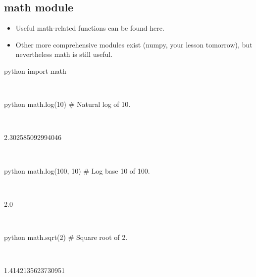 \documentclass[aspectratio=1610,slidestop]{beamer}
\begin{document}
\subsection{math module}
\begin{pframe}
 \begin{itemize}
  \item Useful math-related functions can be found here.
  \item Other more comprehensive modules exist (numpy, your lesson tomorrow),
  but nevertheless math is still useful.
 \end{itemize}
 \begin{ipython}
  \begin{pythonin}{python}
import math
  \end{pythonin}
  \\
  \begin{pythonin}{python}
math.log(10)    # Natural log of 10.
  \end{pythonin}
  \\
  \begin{pythonout}
2.302585092994046
  \end{pythonout}
  \\

  \begin{pythonin}{python}
math.log(100, 10)    # Log base 10 of 100.
  \end{pythonin}
  \\
  \begin{pythonout}
2.0
  \end{pythonout}
  \\

  \begin{pythonin}{python}
math.sqrt(2)    # Square root of 2.
  \end{pythonin}
  \\
  \begin{pythonout}
1.4142135623730951
  \end{pythonout}
 \end{ipython}
\end{pframe}
\end{document}
